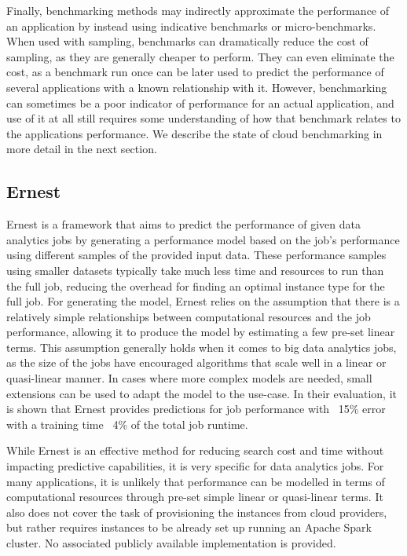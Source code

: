 \documentclass{report}
\begin{document}
Finally, benchmarking methods may indirectly approximate the performance of an application by instead using indicative benchmarks or micro-benchmarks. When used with sampling, benchmarks can dramatically reduce the cost of sampling, as they are generally cheaper to perform. They can even eliminate the cost, as a benchmark run once can be later used to predict the performance of several applications with a known relationship with it. However, benchmarking can sometimes be a poor indicator of performance for an actual application, and use of it at all still requires some understanding of how that benchmark relates to the applications performance. We describe the state of cloud benchmarking in more detail in the next section.

\subsection{Ernest}
Ernest\cite{Venkataraman2016} is a framework that aims to predict the performance of given data analytics jobs by generating a performance model based on the job's performance using different samples of the provided input data. These performance samples using smaller datasets typically take much less time and resources to run than the full job, reducing the overhead for finding an optimal instance type for the full job. For generating the model, Ernest relies on the assumption that there is a relatively simple relationships between computational resources and the job performance, allowing it to  produce the model by estimating a few pre-set linear terms. This assumption generally holds when it comes to big data analytics jobs, as the size of the jobs have encouraged algorithms that scale well in a linear or quasi-linear manner\cite{Bottou2008}. In cases where more complex models are needed, small extensions can be used to adapt the model to the use-case. In their evaluation, it is shown that Ernest provides predictions for job performance with ~15\% error with a training time ~4\% of the total job runtime.

While Ernest is an effective method for reducing search cost and time without impacting predictive capabilities, it is very specific for data analytics jobs. For many applications, it is unlikely that performance can be modelled in terms of computational resources through pre-set simple linear or quasi-linear terms. It also does not cover the task of provisioning the instances from cloud providers, but rather requires instances to be already set up running an Apache Spark cluster. No associated publicly available implementation is provided.
\end{document}
